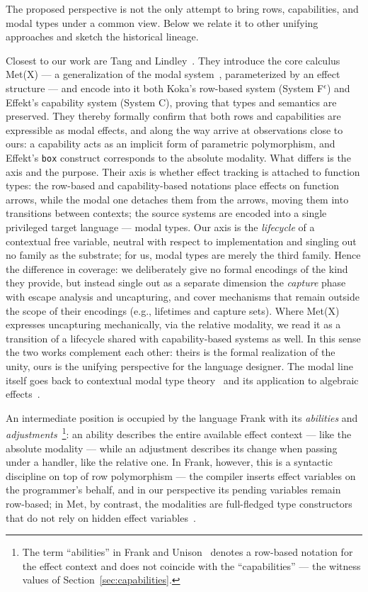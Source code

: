 \documentclass[11pt]{article}
\begin{document}
The proposed perspective is not the only attempt to bring rows, capabilities, and modal
types under a common view. Below we relate it to other unifying approaches and sketch the
historical lineage.

Closest to our work are Tang and Lindley~\cite{tang2026modal}. They introduce the core
calculus Met(X) --- a generalization of the modal system~\cite{tang2025modal},
parameterized by an effect structure --- and encode into it both Koka's row-based system
(System F$^\epsilon$) and Effekt's capability system (System C), proving that types and
semantics are preserved. They thereby formally confirm that both rows and capabilities
are expressible as modal effects, and along the way arrive at observations close to ours:
a capability acts as an implicit form of parametric polymorphism, and Effekt's
\texttt{box} construct corresponds to the absolute modality. What differs is the axis and
the purpose. Their axis is whether effect tracking is attached to function types: the
row-based and capability-based notations place effects on function arrows, while the modal
one detaches them from the arrows, moving them into transitions between contexts; the
source systems are encoded into a single privileged target language --- modal types. Our
axis is the \emph{lifecycle} of a contextual free variable, neutral with respect to
implementation and singling out no family as the substrate; for us, modal types are merely
the third family. Hence the difference in coverage: we deliberately give no formal
encodings of the kind they provide, but instead single out as a separate dimension the
\emph{capture} phase with escape analysis and uncapturing, and cover mechanisms that
remain outside the scope of their encodings (e.g., lifetimes and capture sets). Where
Met(X) expresses uncapturing mechanically, via the relative modality, we read it as a
transition of a lifecycle shared with capability-based systems as well. In this sense the
two works complement each other: theirs is the formal realization of the unity, ours is
the unifying perspective for the language designer. The modal line itself goes back to
contextual modal type theory~\cite{nanevski2008contextual} and its application to
algebraic effects~\cite{zyuzin2021contextual}.

An intermediate position is occupied by the language Frank with its \emph{abilities} and
\emph{adjustments}~\cite{lindley2017do, convent2020doo}\footnote{The term ``abilities''
in Frank and Unison~\cite{unison-abilities} denotes a row-based notation for the effect
context and does not coincide with the ``capabilities'' --- the witness values of
Section~\ref{sec:capabilities}.}:
an ability describes the entire available effect context --- like the absolute
modality --- while an adjustment describes its change when passing under a handler, like
the relative one. In Frank, however, this is a syntactic discipline on top of row
polymorphism --- the compiler inserts effect variables on the programmer's behalf, and in
our perspective its pending variables remain row-based; in Met, by contrast, the
modalities are full-fledged type constructors that do not rely on hidden effect
variables~\cite{tang2025modal}.
\end{document}
